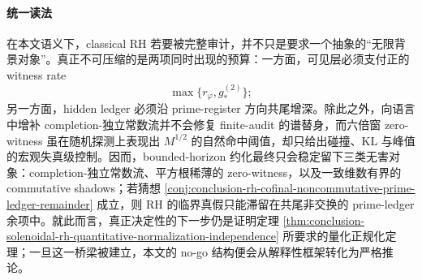 \paragraph{统一读法}
在本文语义下，classical RH 若要被完整审计，并不只是要求一个抽象的“无限背景对象”。真正不可压缩的是两项同时出现的预算：一方面，可见层必须支付正的 witness rate
\[
\max\!\bigl\{r_\varphi,g_*^{(2)}\bigr\};
\]
另一方面，hidden ledger 必须沿 prime-register 方向共尾增深。除此之外，向语言中增补 completion-独立常数流并不会修复 finite-audit 的谱替身，而六倍窗 zero-witness 虽在随机探测上表现出 \(M^{1/2}\) 的自然命中阈值，却只给出碰撞、KL 与峰值的宏观失真级控制。因而，bounded-horizon 约化最终只会稳定留下三类无害对象：completion-独立常数流、平方根稀薄的 zero-witness，以及一致维数有界的 commutative shadows；若猜想 \ref{conj:conclusion-rh-cofinal-noncommutative-prime-ledger-remainder} 成立，则 RH 的临界真假只能滞留在共尾非交换的 prime-ledger 余项中。就此而言，真正决定性的下一步仍是证明定理 \ref{thm:conclusion-solenoidal-rh-quantitative-normalization-independence} 所要求的量化正规化定理；一旦这一桥梁被建立，本文的 no-go 结构便会从解释性框架转化为严格推论。

\endinput
